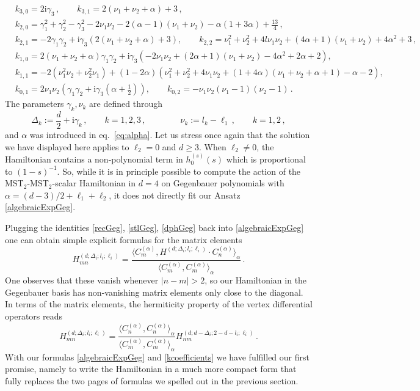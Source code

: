\documentclass{article}
\def \Dg {\Delta}
\def \ag {\alpha}
\def \cg {\gamma}
\begin{document}
\begin{align}
& k_{3,0} = 2\mathrm{i}\cg_3\,, \qquad k_{3,1} = 2(\nu_1+\nu_2+\ag)+3\,,  \nonumber\\
& k_{2,0} = \cg_1^2+\cg_2^2-\cg_3^2-2\nu_1\nu_2 -2 (\ag-1)(\nu_1+\nu_2) - \ag(1+3\ag) + \frac{13}{4}\,, \nonumber\\
& k_{2,1} = -2\cg_1 \cg_2 + \mathrm{i}\cg_3 \left(  2(\nu_1+\nu_2+\ag)+3 \right), \qquad k_{2,2} = \nu_1^2+\nu_2^2 + 4 l\nu_1\nu_2+(4\ag+1)(\nu_1+\nu_2) + 4\ag^2+3\,, \nonumber\\
& k_{1,0} = 2(\nu_1+\nu_2+\ag) \cg_1\cg_2 + \mathrm{i}\cg_3 \left(-2\nu_1\nu_2 + (2\ag+1)(\nu_1+\nu_2) -4\ag^2 + 2 \ag+2\right), \label{kcoefficients}\\
& k_{1,1} = -2(\nu_1^2\nu_2+\nu_2^2\nu_1)+ (1-2\ag)\left(\nu_1^2+\nu_2^2+4 \nu_1 \nu_2 +(1+4\ag)(\nu_1+\nu_2+\ag+1)-\ag-2 \right),  \nonumber\\
& k_{0,1} =2 \nu_1\nu_2 \left(\cg_1\cg_2+\mathrm{i}\cg_3(\ag+\frac{1}{2})  \right), \qquad k_{0,2} = -\nu_1\nu_2(\nu_1-1)(\nu_2-1)\,.\nonumber
\end{align}
The parameters $\cg_k, \nu_k$ are defined through
\begin{equation}
\Dg_k := \frac{d}{2}+\mathrm{i} \cg_k\,, \qquad k=1,2,3\,, \qquad \qquad \nu_k := l_k-\ell_1\,, \qquad k=1,2\,,
\label{new_params}
\end{equation}
and $\alpha$ was introduced in eq.\ \eqref{eq:alpha}. Let us stress once again that the solution 
we have displayed here applies to $\ell_2 =0$ and $d\geq 3$. When $\ell_2 \neq 0$, the Hamiltonian
contains a non-polynomial term in $h_0^{(s)}(s)$ which is proportional to $(1-s)^{-1}$. So, while 
it is in principle possible to compute the action of the MST$_2$-MST$_2$-scalar Hamiltonian in 
$d=4$ on Gegenbauer polynomials with $\ag = (d-3)/2 + \ell_1+\ell_2$, it does not directly fit our Ansatz \eqref{algebraicExpGeg}. 
 
Plugging the identities \eqref{recGeg}, \eqref{stlGeg}, \eqref{dphGeg} back into 
\eqref{algebraicExpGeg} one can obtain simple explicit formulas for the matrix elements 
\begin{equation}
H_{mn}^{(d;\Dg_i;l_i;\ell_i)} = \frac{\langle C_m^{(\ag)}, H^{(d;\Dg_i;l_i;\ell_i)} \cdot C_n^{(\ag)}\rangle_{\ag}}{\langle C_m^{(\ag)}, C_m^{(\ag)} \rangle_{\ag} }\,. \label{MEstoSPs}
\end{equation}
One observes that these vanish whenever $|n-m| > 2$, so our Hamiltonian in the Gegenbauer basis has non-vanishing matrix elements only close to the diagonal. In terms 
of the matrix elements, the hermiticity property of the vertex differential operators 
reads 
\begin{equation}
    H_{mn}^{(d;\Dg_i;l_i;\ell_i)} = \frac{\langle C_n^{(\ag)}, C_n^{(\ag)} \rangle_{\ag}}{\langle C_m^{(\ag)}, C_m^{(\ag)} \rangle_{\ag}}    H_{nm}^{(d;d-\Dg_i;2-d-l_i;\ell_i)}\,.
    \label{hermicity}
\end{equation}
With our formulas \eqref{algebraicExpGeg} and \eqref{kcoefficients} we have fulfilled our 
first promise, namely to write the Hamiltonian in a much more compact form that fully replaces the two pages of formulas we spelled out in the previous section.
\end{document}
